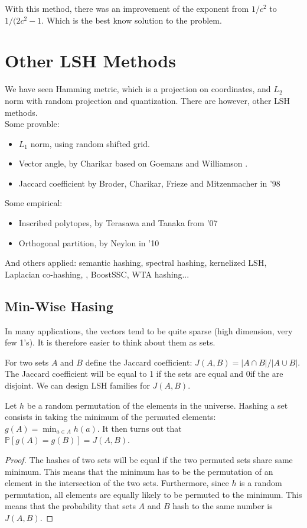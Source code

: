 \documentclass[11pt]{article}
\begin{document}
With this method, there was an improvement of the exponent from $1/c^2$ to $1/(2c^2 -1$. Which is the best know solution to the problem.

\section{Other LSH Methods}

We have seen Hamming metric, which is a projection on coordinates, and $L_2$ norm with random projection and quantization. There are however, other LSH methods.\\
Some provable:
\begin{itemize}
    \item $L_1$ norm, using random shifted grid.
    \item Vector angle, by Charikar \cite{cha02} based on Goemans and Williamson \cite{gw94}.
    \item Jaccard coefficient by Broder, Charikar, Frieze and Mitzenmacher in '98 \cite{bcfm98}
\end{itemize}

\noindent Some empirical:
\begin{itemize}
    \item Inscribed polytopes, by Terasawa and Tanaka from '07 \cite{tt07}
    \item Orthogonal partition, by Neylon in '10 \cite{ney10}
\end{itemize}

And others applied: semantic hashing, spectral hashing, kernelized LSH, Laplacian co-hashing, , BoostSSC, WTA hashing...

\subsection{Min-Wise Hasing}
In many applications, the vectors tend to be quite sparse (high dimension, very few 1’s). It is therefore easier to think about them as sets.

For two sets $A$ and $B$ define the Jaccard coefficient: $J(A,B) = |A\cap B| / |A \cup B|$. The Jaccard coefficient will be equal to 1 if the sets are equal and 0if the are disjoint. We can design LSH families for $J(A,B)$.

Let $h$ be a random permutation of the elements in the universe. Hashing a set consists in taking the minimum of the permuted elements: $g(A) = \min_{a\in A} h(a)$. It then turns out that $\mathbb{P}[g(A) = g(B)] = J(A,B)$.

\begin{proof}
    The hashes of two sets will be equal if the two permuted sets share same minimum. This means that the minimum has to be the permutation of an element in the intersection of the two sets. Furthermore, since $h$ is a random permutation, all elements are equally likely to be permuted to the minimum. This means that the probability that sets $A$ and $B$ hash to the same number is $J(A,B)$.
\end{proof}
\end{document}
